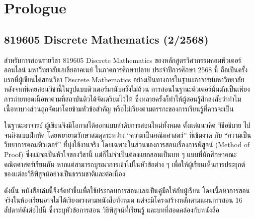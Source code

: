 \chapter*{Prologue}

\section*{819605 Discrete Mathematics (2/2568)}

สำหรับการสอนรายวิชา 819605 Discrete Mathematics ของหลักสูตรวิศวกรรมคอมพิวเตอร์ออนไลน์ มหาวิทยาลัยเอเชียอาคเนย์ ในภาคการศึกษาปลาย ประจำปีการศึกษา 2568 นี้ ถือเป็นครั้งแรกที่ผู้เขียนได้สอนวิชา Discrete Mathematics อย่างเป็นทางการในฐานะอาจารย์มหาวิทยาลัย หลังจากที่เคยสอนวิชานี้ในรูปแบบติวเตอร์มานับครั้งไม่ถ้วน การสอนในฐานะติวเตอร์นั้นมักเป็นเพียงการถ่ายทอดเนื้อหาตามที่สถาบันติวได้จัดเตรียมไว้ให้ ซึ่งหลายครั้งก็ทำให้ผู้สอนรู้สึกสงสัยว่าทำไมเนื้อหาบางส่วนถูกจัดมาโดยข้ามหัวข้อสำคัญ หรือไม่เรียงตามตรรกะของการเรียนรู้ที่ควรจะเป็น  

ในฐานะอาจารย์ ผู้เขียนจึงมีโอกาสได้ออกแบบลำดับการสอนใหม่ทั้งหมด ตั้งแต่แนวคิด วิธีอธิบาย ไปจนถึงแบบฝึกหัด โดยพยายามรักษาสมดุลระหว่าง “ความเป็นคณิตศาสตร์” ที่เข้มงวด กับ “ความเป็นวิทยาการคอมพิวเตอร์” ที่มุ่งใช้งานจริง โดยเฉพาะในส่วนของการสอนเรื่องการพิสูจน์ (Method of Proof) ซึ่งแม้จะเป็นหัวใจของวิชานี้ แต่ก็ไม่จำเป็นต้องแยกสอนเป็นบท ๆ แบบที่นักศึกษาคณะคณิตศาสตร์เรียนกัน หากแต่สามารถบูรณาการเข้าไปในหัวข้อต่าง ๆ เพื่อให้ผู้เรียนเห็นการประยุกต์ของแต่ละวิธีพิสูจน์อย่างเป็นธรรมชาติและต่อเนื่อง  

ดังนั้น หนังสือเล่มนี้จึงจัดทำขึ้นเพื่อใช้ประกอบการสอนและเป็นคู่มือให้กับผู้เรียน โดยเนื้อหาการสอนจริงในห้องเรียนอาจไม่ได้เรียงตรงตามหนังสือทั้งหมด แต่จะมีโครงสร้างหลักตามแผนการสอน 16 สัปดาห์ดังต่อไปนี้ ซึ่งระบุหัวข้อการสอน วิธีพิสูจน์ที่เรียนรู้ และบทที่สอดคล้องกับหนังสือ

